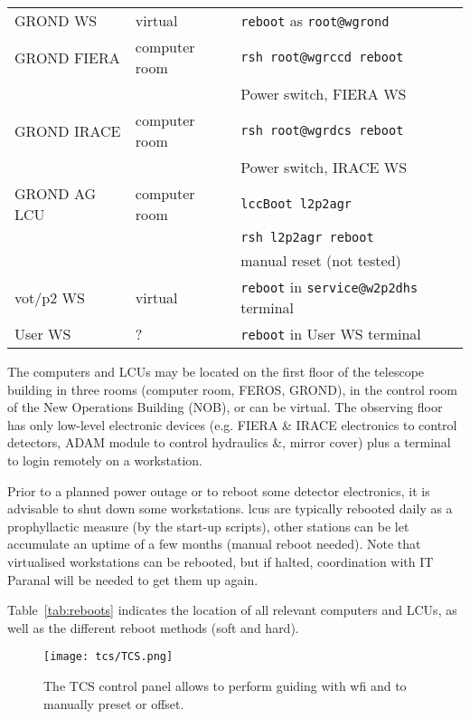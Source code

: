 \documentclass[11pt,fleqn,a4paper]{book}
\begin{document}
\begin{table}[t]
\begin{tabular}{lll}
\hline
GROND WS              & virtual       & \texttt{reboot} as \texttt{root@wgrond}\\
GROND FIERA           & computer room & \texttt{rsh root@\gls{wgrccd} reboot}\\
                      &               & Power switch, FIERA WS\\
GROND IRACE           & computer room & \texttt{rsh root@\gls{wgrdcs} reboot}\\
                      &               & Power switch, IRACE WS\\
GROND AG LCU          & computer room & \texttt{\gls{lccBoot} \gls{l2p2agr}}\\             
                      &               & \texttt{rsh \gls{l2p2agr} reboot}\\
                      &               & manual reset (not tested)\\
\hline
\gls{vot}/\gls{p2} WS & virtual       & \texttt{reboot} in \texttt{service@w2p2dhs} terminal\\
\hline
User WS               & ?             & \texttt{reboot} in User WS terminal\\
\hline
\end{tabular}
\end{table}
The computers and LCUs may be located on the first floor of the telescope building in three rooms (computer room, FEROS, GROND), in the control room of the New  Operations Building (NOB), or can be virtual.  The observing floor has only low-level electronic devices (e.g. FIERA \& IRACE electronics to control detectors, ADAM module to control hydraulics \&, mirror cover) plus a terminal to login remotely on a workstation.

Prior to a planned power outage or to reboot some detector electronics, it is advisable to shut down some workstations.  \glspl{lcu} are typically rebooted daily as a prophyllactic measure (by the start-up scripts), other stations can be let accumulate an uptime of a few months (manual reboot needed).  Note that virtualised workstations can be rebooted, but if halted, coordination with IT Paranal will be needed to get them up again.

Table~\ref{tab:reboots} indicates the location of all relevant computers and LCUs, as well as the different reboot methods (soft and hard).

\begin{figure}[!ht]
\centering
\texttt{[image: tcs/TCS.png]}
\caption[Main panel of the telescope control software]{The \gls{TCS control panel} allows to perform guiding with \gls{wfi} and to manually preset or offset.}
\label{fig:tcs}
\end{figure}
\end{document}

